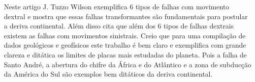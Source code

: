 \documentclass[manuscript]{geophysics}[10pt]
\begin{document}
Neste artigo J. Tuzzo Wilson exemplifica 6 tipos de falhas com movimento dextral e mostra que essas falhas transformantes são fundamentais para postular a deriva continental. Além disso cita que além dos 6 tipos de falhas dextrais existem as falhas com movimentos sinistrais. Creio que para uma compilação de dados geológicos e geofísicos este trabalho é bem claro e exemplifica com grande clareza e ditática os limites de placas mais estudadas do planeta. Pois a falha de Santo André, a abertura do chifre da África e do Atlântico e a zona de subducção da América do Sul são exemplos bem ditáticos da deriva continental. 





    
\end{document}
